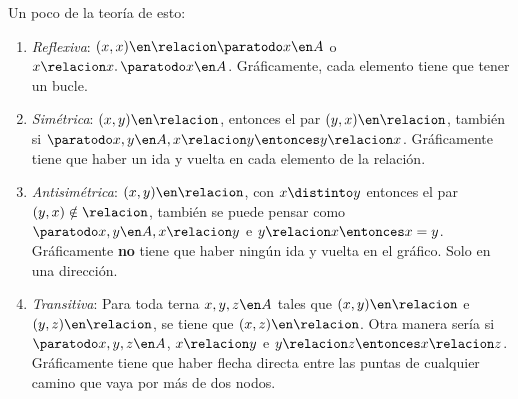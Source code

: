 Un poco de la teoría de esto:
\begin{enumerate}
  \item  \textit{Reflexiva}: $(x, x) \en \relacion \paratodo x \en A$ o $x \relacion x.\, \paratodo x \en A$. Gráficamente,
        cada elemento tiene que tener un bucle.

  \item  \textit{Simétrica}: $(x, y) \en \relacion$, entonces el par $(y, x) \en \relacion$,
        también si $\paratodo x, y \en A, x\relacion y \entonces y \relacion x$.
        Gráficamente tiene que haber un ida y vuelta en cada elemento de la relación.

  \item  \textit{Antisimétrica}: $(x, y) \en \relacion$, con $x \distinto y$ entonces el par $(y, x) \notin \relacion$, también se puede pensar
        como $\paratodo x,y \en A, x\relacion y$ e $ y \relacion x \entonces x = y$.
        Gráficamente \textbf{no} tiene que haber ningún ida y vuelta en el gráfico. Solo en una dirección.

  \item  \textit{Transitiva}: Para toda terna $x, y, z \en A$ tales que $(x, y) \en \relacion$ e $(y,z) \en \relacion$,
        se tiene que $(x, z) \en \relacion$.
        Otra manera sería si $\paratodo x, y, z \en A$, $x \relacion y$ e $y \relacion z \entonces x\relacion z$.
        Gráficamente tiene que haber flecha directa entre las puntas de cualquier camino que vaya por más de dos nodos.
\end{enumerate}
